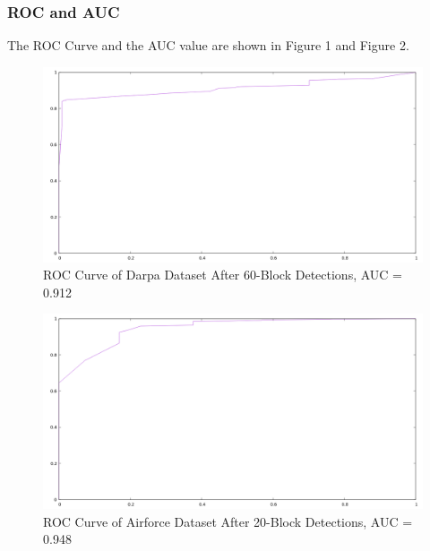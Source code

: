 \subsubsection{ROC and AUC}
The ROC Curve and the AUC value are shown in Figure 1 and Figure 2.
\begin{figure}
\includegraphics[scale=0.5]{roc1.png}
\caption{ROC Curve of Darpa Dataset After 60-Block Detections, AUC = 0.912}
\end{figure}

\begin{figure}
\includegraphics[scale=0.5]{roc2.png}
\caption{ROC Curve of Airforce Dataset After 20-Block Detections, AUC = 0.948}
\end{figure}
